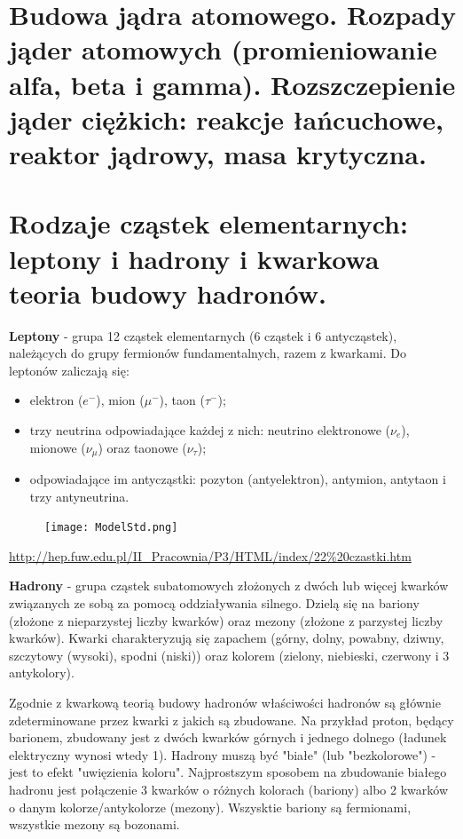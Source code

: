 \documentclass{article}
\begin{document}
\section{Budowa jądra atomowego. Rozpady jąder atomowych (promieniowanie alfa, beta i gamma). Rozszczepienie jąder ciężkich: reakcje łańcuchowe, reaktor jądrowy, masa krytyczna.}

\section{Rodzaje cząstek elementarnych: leptony i hadrony i kwarkowa teoria budowy hadronów.}
\textbf{Leptony} - grupa 12 cząstek elementarnych (6 cząstek i 6 antycząstek), należących do grupy fermionów fundamentalnych, razem z kwarkami. Do leptonów zaliczają się:
\begin{itemize}
\item elektron ($e^-$), mion ($\mu^-$), taon ($\tau^-$);
\item trzy neutrina odpowiadające każdej z nich: neutrino elektronowe ($\nu_e$), mionowe ($\nu_{\mu}$) oraz taonowe ($\nu_{\tau}$);
\item odpowiadające im antycząstki: pozyton (antyelektron), antymion, antytaon i trzy antyneutrina.
\end{itemize}
\begin{figure}[H]
    \centering
    \texttt{[image: ModelStd.png]}
\end{figure}

\url{http://hep.fuw.edu.pl/II_Pracownia/P3/HTML/index/22%20czastki.htm}

\textbf{Hadrony} - grupa cząstek subatomowych złożonych z dwóch lub więcej kwarków związanych ze sobą za pomocą oddziaływania silnego. Dzielą się na bariony (złożone z nieparzystej liczby kwarków) oraz mezony (złożone z parzystej liczby kwarków). Kwarki charakteryzują się zapachem (górny, dolny, powabny, dziwny, szczytowy (wysoki), spodni (niski)) oraz kolorem (zielony, niebieski, czerwony i 3 antykolory).

Zgodnie z kwarkową teorią budowy hadronów właściwości hadronów są głównie zdeterminowane przez kwarki z jakich są zbudowane. Na przykład proton, będący barionem, zbudowany jest z dwóch kwarków górnych i jednego dolnego (ładunek elektryczny wynosi wtedy 1). Hadrony muszą być "białe" (lub "bezkolorowe") - jest to efekt "uwięzienia koloru". Najprostszym sposobem na zbudowanie białego hadronu jest połączenie 3 kwarków o różnych kolorach (bariony) albo 2 kwarków o danym kolorze/antykolorze (mezony). Wszysktie bariony są fermionami, wszystkie mezony są bozonami.
\end{document}
